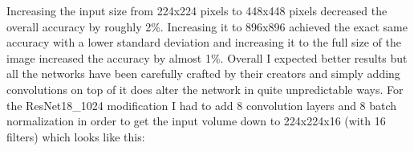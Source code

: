 \begin{table}[!h] \centering
{}
\caption{Different image input sizes are fed into ResNet18 architectures with only 16 filters per layer. The first layers of the network have been adapted to allow bigger input images}
\label{tbl:resnet18-different-input}
\end{table}

Increasing the input size from 224x224 pixels to 448x448 pixels decreased the overall accuracy by roughly 2\%. Increasing it to 896x896 achieved the exact same accuracy with a lower standard deviation and increasing it to the full size of the image increased the accuracy by almost 1\%. Overall I expected better results but all the networks have been carefully crafted by their creators and simply adding convolutions on top of it does alter the network in quite unpredictable ways. For the ResNet18\_1024 modification I had to add 8 convolution layers and 8 batch normalization in order to get the input volume down to 224x224x16 (with 16 filters) which looks like this:

